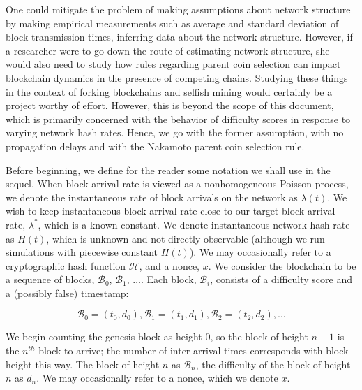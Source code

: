 \documentclass[12pt,english]{mrl}
\theoremstyle{definition}
\numberwithin{equation}{section}
\numberwithin{figure}{section}
\numberwithin{equation}{section}
\numberwithin{equation}{section}
\numberwithin{figure}{section}
\begin{document}
One could mitigate the problem of making assumptions about network structure by making empirical measurements such as average and standard deviation of block transmission times,  inferring data about the network structure.  However, if a researcher were to go down the route of estimating network structure, she would also need to study how rules regarding parent coin selection can impact blockchain dynamics in the presence of competing chains.  Studying these things in the context of forking blockchains and selfish mining would certainly be a project worthy of effort. However, this is beyond the scope of this document, which is primarily concerned with the behavior of difficulty scores in response to varying network hash rates. Hence, we go with the former assumption, with no propagation delays and with the Nakamoto parent coin selection rule.

Before beginning, we define for the reader some notation we shall use in the sequel.  When block arrival rate is viewed as a nonhomogeneous Poisson process, we denote the instantaneous rate of block arrivals on the network as $\lambda(t)$. We wish to keep instantaneous block arrival rate close to our target block arrival rate, $\lambda^*$, which is a known constant. We denote instantaneous network hash rate as $H(t)$, which is unknown and not directly observable (although we run simulations with piecewise constant $H(t)$). We may occasionally refer to a cryptographic hash function $\mathcal{H}$, and a nonce, $x$. We consider the blockchain to be a sequence of blocks, $\mathcal{B}_0$, $\mathcal{B}_1$, $\ldots$. Each block, $\mathcal{B}_i$, consists of a difficulty score and a (possibly false) timestamp:

\[\mathcal{B}_0 = (t_0, d_0), \mathcal{B}_1 = (t_1, d_1), \mathcal{B}_2 = (t_2, d_2), \ldots\]

We begin counting the genesis block as height $0$, so the block of height $n-1$ is the $n^{th}$ block to arrive; the number of inter-arrival times corresponds with block height this way. The block of height $n$ as $\mathcal{B}_{n}$, the difficulty of the block of height $n$ as $d_{n}$. We may occasionally refer to a nonce, which we denote $x$.
\end{document}
